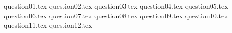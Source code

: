 \documentclass[french, 12pt]{article}
\begin{document}

\pagebreak
{question01.tex}
\pagebreak
{question02.tex}
\pagebreak
{question03.tex}
\pagebreak
{question04.tex}
\pagebreak
{question05.tex}
\pagebreak
{question06.tex}
\pagebreak
{question07.tex}
\pagebreak
{question08.tex}
\pagebreak
{question09.tex}
\pagebreak
{question10.tex}
\pagebreak
{question11.tex}
\pagebreak
{question12.tex}
\end{document}
